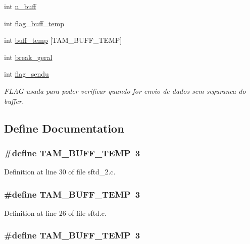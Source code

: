 \begin{DoxyCompactItemize}
\item 
int \hyperlink{group__SFTD_gaeed3ab3cfaa81fc518da034ffff8576c}{n\_\-buff}
\item 
int \hyperlink{group__SFTD_gab01f6df89a2c590dbf207e6e2ce01bf2}{flag\_\-buff\_\-temp}
\item 
int \hyperlink{group__SFTD_gaf04e37b7953920f8142c8ebf2b9f7d13}{buff\_\-temp} \mbox{[}TAM\_\-BUFF\_\-TEMP\mbox{]}
\item 
int \hyperlink{group__SFTD_gadd34d8f0c83196f8b20622a06ddead79}{break\_\-geral}
\item 
int \hyperlink{group__SFTD_ga2154b2a39f2c03e7fd41ea4c626dfefc}{flag\_\-sendu}
\begin{DoxyCompactList}\small\item\em FLAG usada para poder verificar quando for envio de dados sem seguranca do buffer. \item\end{DoxyCompactList}\end{DoxyCompactItemize}


\subsection{Define Documentation}
\hypertarget{group__SFTD_gaa5186a00142139694fa51998303b63a0}{
\subsubsection[{TAM\_\-BUFF\_\-TEMP}]{\setlength{\rightskip}{0pt plus 5cm}\#define TAM\_\-BUFF\_\-TEMP~3}}
\label{group__SFTD_gaa5186a00142139694fa51998303b63a0}


Definition at line 30 of file sftd\_\-2.c.

\hypertarget{group__SFTD_gaa5186a00142139694fa51998303b63a0}{
\subsubsection[{TAM\_\-BUFF\_\-TEMP}]{\setlength{\rightskip}{0pt plus 5cm}\#define TAM\_\-BUFF\_\-TEMP~3}}
\label{group__SFTD_gaa5186a00142139694fa51998303b63a0}


Definition at line 26 of file sftd.c.

\hypertarget{group__SFTD_gaa5186a00142139694fa51998303b63a0}{
\subsubsection[{TAM\_\-BUFF\_\-TEMP}]{\setlength{\rightskip}{0pt plus 5cm}\#define TAM\_\-BUFF\_\-TEMP~3}}
\label{group__SFTD_gaa5186a00142139694fa51998303b63a0}


